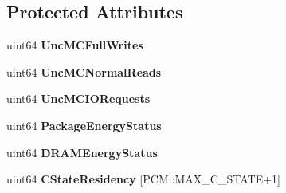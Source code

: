 \subsection*{Protected Attributes}
\begin{DoxyCompactItemize}
\item 
uint64 {\bfseries Unc\+M\+C\+Full\+Writes}\label{classUncoreCounterState_a3e59bb4c79f6040b17b104194a5e29fb}

\item 
uint64 {\bfseries Unc\+M\+C\+Normal\+Reads}\label{classUncoreCounterState_a5a07c23a907365682137c5d8c1cf79ad}

\item 
uint64 {\bfseries Unc\+M\+C\+I\+O\+Requests}\label{classUncoreCounterState_a4c3d0db74283d9420d9089e2c2553561}

\item 
uint64 {\bfseries Package\+Energy\+Status}\label{classUncoreCounterState_a74bdee47e68bbc55c2ee023fc3bfe76d}

\item 
uint64 {\bfseries D\+R\+A\+M\+Energy\+Status}\label{classUncoreCounterState_a03c78bbb9fb36c84c075b8d72fc5eed9}

\item 
uint64 {\bfseries C\+State\+Residency} [P\+C\+M\+::\+M\+A\+X\+\_\+\+C\+\_\+\+S\+T\+A\+T\+E+1]\label{classUncoreCounterState_a5819f82036b4386ca638d0755cdc7388}

\end{DoxyCompactItemize}
